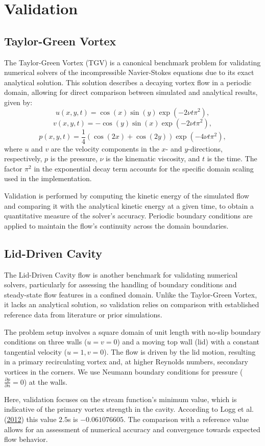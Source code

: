 \section{Validation}

\subsection{Taylor-Green Vortex}
The Taylor-Green Vortex (TGV) is a canonical benchmark problem for validating numerical solvers of the incompressible Navier-Stokes equations due to its exact analytical solution.
This solution describes a decaying vortex flow in a periodic domain, allowing for direct comparison between simulated and analytical results, given by:
\[
u(x, y, t) = \cos(x) \sin(y) \exp(-2 \nu t \pi^2),
\]
\[
v(x, y, t) = -\cos(y) \sin(x) \exp(-2 \nu t \pi^2),
\]
\[
p(x, y, t) = \frac{1}{4} \left( \cos(2x) + \cos(2y) \right) \exp(-4 \nu t \pi^2),
\]
where \( u \) and \( v \) are the velocity components in the \( x \)- and \( y \)-directions, respectively, \( p \) is the pressure, \( \nu \) is the kinematic viscosity, and \( t \) is the time.
The factor \( \pi^2 \) in the exponential decay term accounts for the specific domain scaling used in the implementation.

Validation is performed by computing the kinetic energy of the simulated flow and comparing it with the analytical kinetic energy at a given time, to obtain a quantitative measure of the solver's accuracy.
Periodic boundary conditions are applied to maintain the flow's continuity across the domain boundaries.

\subsection{Lid-Driven Cavity}

The Lid-Driven Cavity flow is another benchmark for validating numerical solvers, particularly for assessing the handling of boundary conditions and steady-state flow features in a confined domain.
Unlike the Taylor-Green Vortex, it lacks an analytical solution, so validation relies on comparison with established reference data from literature or prior simulations.

The problem setup involves a square domain of unit length with no-slip boundary conditions on three walls (\( u = v = 0 \)) and a moving top wall (lid) with a constant tangential velocity (\( u = 1, v = 0 \)).
The flow is driven by the lid motion, resulting in a primary recirculating vortex and, at higher Reynolds numbers, secondary vortices in the corners.
We use Neumann boundary conditions for pressure (\( \frac{\partial p}{\partial n} = 0 \)) at the walls.

Here, validation focuses on the stream function's minimum value, which is indicative of the primary vortex strength in the cavity.
According to Logg et al. (\href{https://doi.org/10.1007/978-3-642-23099-8}{2012}) this value $2.5$s is $-0.061076605$.
The comparison with a reference value allows for an assessment of numerical accuracy and convergence towards expected flow behavior.
